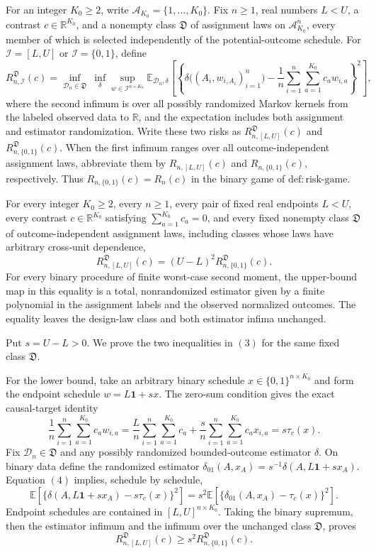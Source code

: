 For an integer \(K_0\ge2\), write \(\mathcal A_{K_0}=\{1,\ldots,K_0\}\).  Fix \(n\ge1\), real numbers \(L<U\), a contrast \(c\in\mathbb R^{K_0}\), and a nonempty class \(\mathfrak D\) of assignment laws on \(\mathcal A_{K_0}^n\), every member of which is selected independently of the potential-outcome schedule.  For \(\mathcal I=[L,U]\) or \(\mathcal I=\{0,1\}\), define
\[
 R^{\mathfrak D}_{n,\mathcal I}(c)
 =\inf_{\mathcal D_n\in\mathfrak D}\ \inf_{\delta}
   \sup_{w\in\mathcal I^{n\times K_0}}
   \mathbb E_{\mathcal D_n,\delta}\!\left[
   \left\{\delta\bigl((A_i,w_{i,A_i})_{i=1}^n\bigr)
   -\frac1n\sum_{i=1}^n\sum_{a=1}^{K_0}c_aw_{i,a}
   \right\}^2\right],
\]
where the second infimum is over all possibly randomized Markov kernels from the labeled observed data to \(\mathbb R\), and the expectation includes both assignment and estimator randomization.  Write these two risks as \(R^{\mathfrak D}_{n,[L,U]}(c)\) and \(R^{\mathfrak D}_{n,\{0,1\}}(c)\).  When the first infimum ranges over all outcome-independent assignment laws, abbreviate them by \(R_{n,[L,U]}(c)\) and \(R_{n,\{0,1\}}(c)\), respectively.  Thus \(R_{n,\{0,1\}}(c)=R_n(c)\) in the binary game of \(\mathrm{def:risk\text{-}game}\).

For every integer \(K_0\ge2\), every \(n\ge1\), every pair of fixed real endpoints \(L<U\), every contrast \(c\in\mathbb R^{K_0}\) satisfying \(\sum_{a=1}^{K_0}c_a=0\), and every fixed nonempty class \(\mathfrak D\) of outcome-independent assignment laws, including classes whose laws have arbitrary cross-unit dependence,
\[
 R^{\mathfrak D}_{n,[L,U]}(c)
 =(U-L)^2R^{\mathfrak D}_{n,\{0,1\}}(c).
\tag{3}
\]
For every binary procedure of finite worst-case second moment, the upper-bound map in this equality is a total, nonrandomized estimator given by a finite polynomial in the assignment labels and the observed normalized outcomes.  The equality leaves the design-law class and both estimator infima unchanged.

Put \(s=U-L>0\).  We prove the two inequalities in \((3)\) for the same fixed class \(\mathfrak D\).

For the lower bound, take an arbitrary binary schedule \(x\in\{0,1\}^{n\times K_0}\) and form the endpoint schedule \(w=L\mathbf 1+sx\).  The zero-sum condition gives the exact causal-target identity
\[
 \frac1n\sum_{i=1}^n\sum_{a=1}^{K_0}c_aw_{i,a}
 =\frac{L}{n}\sum_{i=1}^n\sum_{a=1}^{K_0}c_a
  +\frac{s}{n}\sum_{i=1}^n\sum_{a=1}^{K_0}c_ax_{i,a}
 =s\tau_c(x).
\tag{4}
\]
Fix \(\mathcal D_n\in\mathfrak D\) and any possibly randomized bounded-outcome estimator \(\delta\).  On binary data define the randomized estimator
\(
\delta_{01}(A,x_A)=s^{-1}\delta(A,L\mathbf1+sx_A)
\).
Equation \((4)\) implies, schedule by schedule,
\[
 \mathbb E\!\left[
 \{\delta(A,L\mathbf1+sx_A)-s\tau_c(x)\}^2\right]
 =s^2\mathbb E\!\left[
 \{\delta_{01}(A,x_A)-\tau_c(x)\}^2\right].
\]
Endpoint schedules are contained in \([L,U]^{n\times K_0}\).  Taking the binary supremum, then the estimator infimum and the infimum over the unchanged class \(\mathfrak D\), proves
\[
 R^{\mathfrak D}_{n,[L,U]}(c)
 \ge s^2R^{\mathfrak D}_{n,\{0,1\}}(c).
\]


